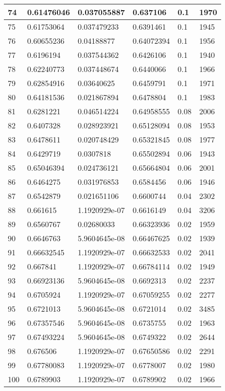 \begin{longtable}{|l|l|l|l|l|l|}
74 & 0.61476046 & 0.037055887 & 0.637106 & 0.1 & 1970 \\ \hline 
75 & 0.61753064 & 0.037479233 & 0.6391461 & 0.1 & 1945 \\ \hline 
76 & 0.60655236 & 0.04188877 & 0.64072394 & 0.1 & 1956 \\ \hline 
77 & 0.6196194 & 0.037544362 & 0.6426106 & 0.1 & 1940 \\ \hline 
78 & 0.62240773 & 0.037448674 & 0.6440066 & 0.1 & 1966 \\ \hline 
79 & 0.62854916 & 0.03640625 & 0.6459791 & 0.1 & 1971 \\ \hline 
80 & 0.64181536 & 0.021867894 & 0.6478804 & 0.1 & 1983 \\ \hline 
81 & 0.6281221 & 0.046514224 & 0.64958555 & 0.08 & 2006 \\ \hline 
82 & 0.6407328 & 0.028923921 & 0.65128094 & 0.08 & 1953 \\ \hline 
83 & 0.6478611 & 0.020748429 & 0.65321845 & 0.08 & 1977 \\ \hline 
84 & 0.6429719 & 0.0307818 & 0.65502894 & 0.06 & 1943 \\ \hline 
85 & 0.65046394 & 0.024736121 & 0.65664804 & 0.06 & 2001 \\ \hline 
86 & 0.6464275 & 0.031976853 & 0.6584456 & 0.06 & 1946 \\ \hline 
87 & 0.6542879 & 0.021651106 & 0.6600744 & 0.04 & 2302 \\ \hline 
88 & 0.661615 & 1.1920929e-07 & 0.6616149 & 0.04 & 3206 \\ \hline 
89 & 0.6560767 & 0.02680033 & 0.66323936 & 0.02 & 1959 \\ \hline 
90 & 0.6646763 & 5.9604645e-08 & 0.66467625 & 0.02 & 1939 \\ \hline 
91 & 0.66632545 & 1.1920929e-07 & 0.66632533 & 0.02 & 2041 \\ \hline 
92 & 0.667841 & 1.1920929e-07 & 0.66784114 & 0.02 & 1949 \\ \hline 
93 & 0.66923136 & 5.9604645e-08 & 0.6692313 & 0.02 & 2237 \\ \hline 
94 & 0.6705924 & 1.1920929e-07 & 0.67059255 & 0.02 & 2277 \\ \hline 
95 & 0.6721013 & 5.9604645e-08 & 0.6721014 & 0.02 & 3485 \\ \hline 
96 & 0.67357546 & 5.9604645e-08 & 0.6735755 & 0.02 & 1963 \\ \hline 
97 & 0.67493224 & 5.9604645e-08 & 0.6749322 & 0.02 & 2644 \\ \hline 
98 & 0.676506 & 1.1920929e-07 & 0.67650586 & 0.02 & 2291 \\ \hline 
99 & 0.67780083 & 1.1920929e-07 & 0.6778007 & 0.02 & 1980 \\ \hline 
100 & 0.6789903 & 1.1920929e-07 & 0.6789902 & 0.02 & 1966 \\ \hline 
\end{longtable}